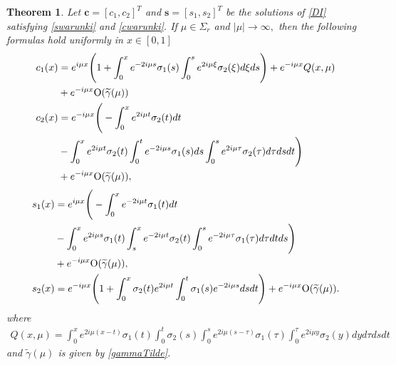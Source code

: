 \documentclass[11pt]{amsart}
\theoremstyle{plain}
\newtheorem{thm}{Theorem}[section]
\theoremstyle{definition}
\theoremstyle{remark}
\numberwithin{equation}{section}
\begin{document}
\begin{thm}\label{main1}
Let $\mathbf{c}=[c_1,c_2]^T$ and $\mathbf{s}=[s_1,s_2]^T$ be the solutions of
\eqref{DI}  satisfying
\eqref{swarunki} and \eqref{cwarunki}.
If  $\mu \in \Sigma_r$ and $|\mu|\to \infty,$ then the following
formulas hold uniformly in $x\in [0,1]$
\begin{align*}
c_1(x)
&=e^{i\mu x}\Bigg(1+\int_0^xe^{-2i\mu s}\sigma_1(s)\int_0^s e^{2i\mu \xi}\sigma_2(\xi) d \xi ds\Bigg) + e^{-i\mu x}Q(x,\mu)\\
&+e^{-i\mu x}{\rm O}(\widetilde{\gamma}(\mu))\\
c_2(x)&= e^{-i\mu x}\Bigg(-\int_0^xe^{2i \mu t}\sigma_2(t) dt\\
&-\int_0^xe^{2i \mu t}\sigma_2(t) \int_0^te^{-2i \mu s}\sigma_1(s)ds\int_0^se^{2i \mu \tau}\sigma_2(\tau) d\tau ds dt\Bigg)\\
&+e^{-i\mu x }{\rm O}(\widetilde{\gamma}(\mu)),
\end{align*}
\begin{align*}
s_1(x)&= e^{i\mu x}\Bigg(-\int_0^xe^{-2i \mu t}\sigma_1(t) dt\\
&-\int_0^xe^{2i \mu s}\sigma_1(t) \int_s^xe^{-2i \mu t}\sigma_2(t)\int_0^se^{-2i \mu \tau}\sigma_1(\tau) d\tau dt ds\Bigg)\\
&+e^{-i\mu x}{\rm O}(\widetilde{\gamma}(\mu)),\\
s_2(x)&= e^{-i\mu x}\Bigg(1+\int_0^x\sigma_2(t)e^{2i\mu t}\int_0^t\sigma_1(s)e^{-2i\mu s} ds dt\Bigg)+e^{-i\mu x}{\rm O}(\widetilde{\gamma}(\mu)).
\end{align*}
where
\begin{align}\label{L}
Q(x,\mu) = \int_0^xe^{2i \mu (x-t)}\sigma_1(t)\int_0^t\sigma_2(s)\int_0^se^{2i\mu(s-\tau)}\sigma_1(\tau)\int_0^{\tau} e^{2i \mu y}\sigma_2(y) dy d\tau ds dt
\end{align}
and $\widetilde{\gamma}(\mu)$ is given by \eqref{gammaTilde}.
\end{thm}
\end{document}
